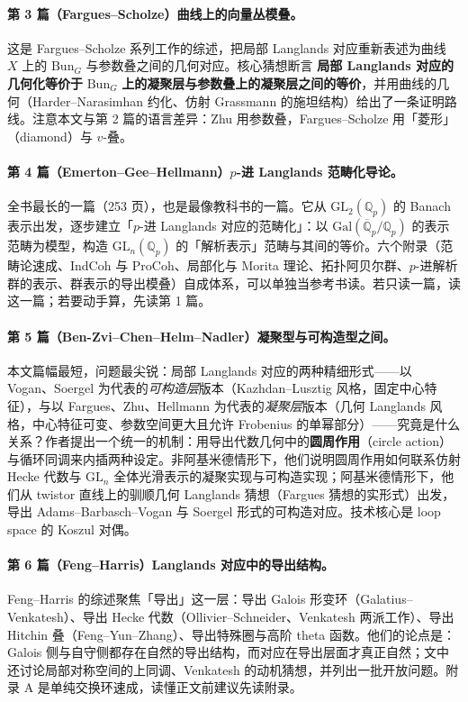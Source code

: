 \paragraph{第 3 篇（Fargues–Scholze）曲线上的向量丛模叠。}
这是 Fargues–Scholze 系列工作的综述，把局部 Langlands 对应重新表述为曲线 $X$ 上的 $\mathrm{Bun}_G$ 与参数叠之间的几何对应。核心猜想断言 \textbf{局部 Langlands 对应的几何化等价于 }$\mathrm{Bun}_G$ \textbf{上的凝聚层与参数叠上的凝聚层之间的等价}，并用曲线的几何（Harder–Narasimhan 约化、仿射 Grassmann 的施坦结构）给出了一条证明路线。注意本文与第 2 篇的语言差异：Zhu 用参数叠，Fargues–Scholze 用「菱形」（diamond）与 $v$-叠。

\paragraph{第 4 篇（Emerton–Gee–Hellmann）$p$-进 Langlands 范畴化导论。}
全书最长的一篇（253 页），也是最像教科书的一篇。它从 $\mathrm{GL}_2(\mathbb Q_p)$ 的 Banach 表示出发，逐步建立「$p$-进 Langlands 对应的范畴化」：以 $\mathrm{Gal}(\overline{\mathbb Q}_p/\mathbb Q_p)$ 的表示范畴为模型，构造 $\mathrm{GL}_n(\mathbb Q_p)$ 的「解析表示」范畴与其间的等价。六个附录（范畴论速成、IndCoh 与 ProCoh、局部化与 Morita 理论、拓扑阿贝尔群、$p$-进解析群的表示、群表示的导出模叠）自成体系，可以单独当参考书读。若只读一篇，读这一篇；若要动手算，先读第 1 篇。

\paragraph{第 5 篇（Ben-Zvi–Chen–Helm–Nadler）凝聚型与可构造型之间。}
本文篇幅最短，问题最尖锐：局部 Langlands 对应的两种精细形式——以 Vogan、Soergel 为代表的\emph{可构造层}版本（Kazhdan–Lusztig 风格，固定中心特征），与以 Fargues、Zhu、Hellmann 为代表的\emph{凝聚层}版本（几何 Langlands 风格，中心特征可变、参数空间更大且允许 Frobenius 的单幂部分）——究竟是什么关系？作者提出一个统一的机制：用导出代数几何中的\textbf{圆周作用}（circle action）与循环同调来内插两种设定。非阿基米德情形下，他们说明圆周作用如何联系仿射 Hecke 代数与 $\mathrm{GL}_n$ 全体光滑表示的凝聚实现与可构造实现；阿基米德情形下，他们从 twistor 直线上的驯顺几何 Langlands 猜想（Fargues 猜想的实形式）出发，导出 Adams–Barbasch–Vogan 与 Soergel 形式的可构造对应。技术核心是 loop space 的 Koszul 对偶。

\paragraph{第 6 篇（Feng–Harris）Langlands 对应中的导出结构。}
Feng–Harris 的综述聚焦「导出」这一层：导出 Galois 形变环（Galatius–Venkatesh）、导出 Hecke 代数（Ollivier–Schneider、Venkatesh 两派工作）、导出 Hitchin 叠（Feng–Yun–Zhang）、导出特殊圈与高阶 theta 函数。他们的论点是：Galois 侧与自守侧都存在自然的导出结构，而对应在导出层面才真正自然；文中还讨论局部对称空间的上同调、Venkatesh 的动机猜想，并列出一批开放问题。附录 A 是单纯交换环速成，读懂正文前建议先读附录。

